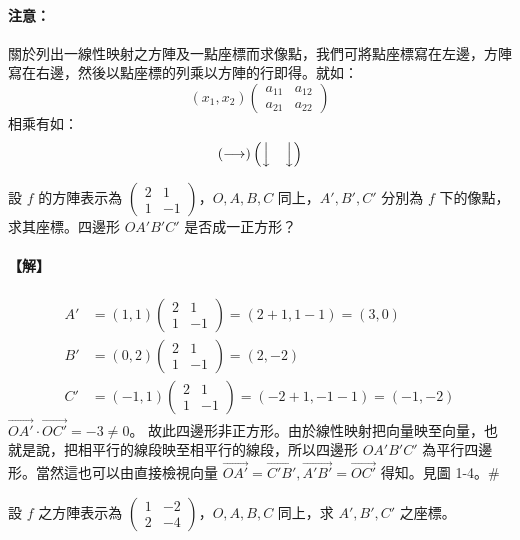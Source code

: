 \paragraph{注意：}關於列出一線性映射之方陣及一點座標而求像點，我們可將點座標寫在左邊，方陣寫在右邊，然後以點座標的列乘以方陣的行即得。就如：
\[ (x_1, x_2) \begin{pmatrix} a_{11} & a_{12} \\ a_{21} & a_{22} \end{pmatrix} \]
相乘有如：
\[ (\longrightarrow) \begin{pmatrix} \Big\downarrow & \Big\downarrow \end{pmatrix} \]

\begin{example}\label{ex:b6s-1-8}
設 $f$ 的方陣表示為 $\begin{pmatrix} 2 & 1 \\ 1 & -1 \end{pmatrix}$，$O, A, B, C$ 同上，$A', B', C'$ 分別為 $f$ 下的像點，求其座標。四邊形 $OA'B'C'$ 是否成一正方形？
\end{example}

\paragraph{【解】}
\begin{align*}
A' &= (1, 1) \begin{pmatrix} 2 & 1 \\ 1 & -1 \end{pmatrix} = (2+1, 1-1) = (3, 0) \\
B' &= (0, 2) \begin{pmatrix} 2 & 1 \\ 1 & -1 \end{pmatrix} = (2, -2) \\
C' &= (-1, 1) \begin{pmatrix} 2 & 1 \\ 1 & -1 \end{pmatrix} = (-2+1, -1-1) = (-1, -2)
\end{align*}
$\vec{OA'} \cdot \vec{OC'} = -3 \ne 0$。
故此四邊形非正方形。由於線性映射把向量映至向量，也就是說，把相平行的線段映至相平行的線段，所以四邊形 $OA'B'C'$ 為平行四邊形。當然這也可以由直接檢視向量 $\vec{OA'}=\vec{C'B'}, \vec{A'B'}=\vec{OC'}$ 得知。見圖 1-4。\hfill$\#$

\begin{example}\label{ex:b6s-1-9}
設 $f$ 之方陣表示為 $\begin{pmatrix} 1 & -2 \\ 2 & -4 \end{pmatrix}$，$O, A, B, C$ 同上，求 $A', B', C'$ 之座標。
\end{example}

